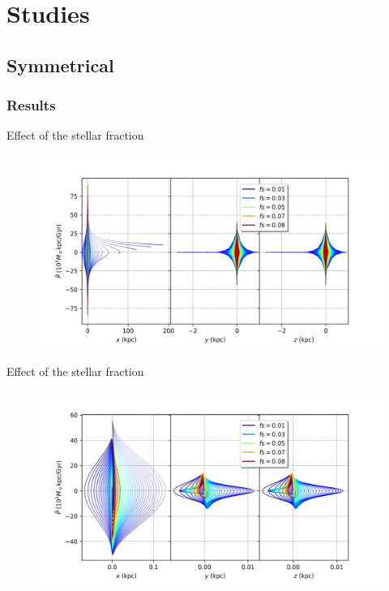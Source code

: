 \documentclass{beamer}
\begin{document}
\section{Studies}
\subsection{Symmetrical}

\subsubsection{Results}
\begin{frame}{Effect of the stellar fraction}
	\begin{figure}[h]
		\centering
		\includegraphics[width=\linewidth]{"../Files/Week 9/PhaseSpace_escape"}
	\end{figure}
\end{frame}

\begin{frame}{Effect of the stellar fraction}
	\begin{figure}[h]
		\centering
		\includegraphics[width=\linewidth]{"../Files/Week 9/PhaseSpace_in"}
	\end{figure}
\end{frame}
\end{document}

